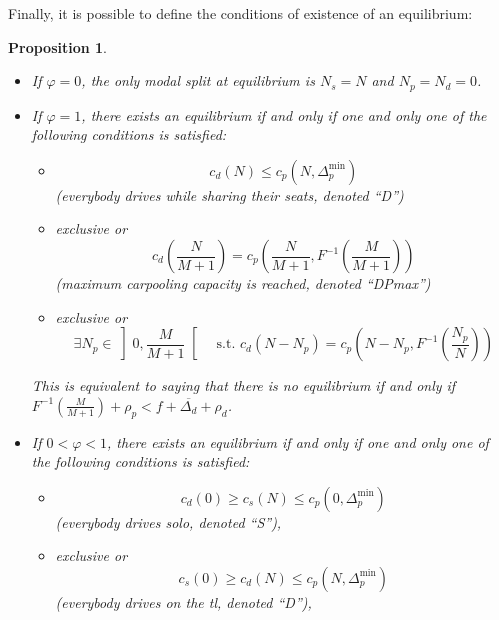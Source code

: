 \documentclass[english, a4paper]{article}
\theoremstyle{plain}
\newtheorem{proposition}{Proposition}
\theoremstyle{definition}
\theoremstyle{remark}
\begin{document}
Finally, it is possible to define the conditions of existence of an equilibrium:

\begin{proposition}
\label{proposition:equilibrium_existence_conditions}
    \begin{itemize}
        \item If $\varphi = 0$, the only modal split at equilibrium is $N_s = N$ and $N_p = N_d = 0$.
        \item If $\varphi = 1$, there exists an equilibrium if and only if one and only one of the following conditions is satisfied:
        \begin{itemize}
            \item \begin{equation} \label{equation:phi0_condD} c_d(N) \leq c_p(N, \Delta_p^{\text{min}}) \end{equation} (everybody drives while sharing their seats, denoted ``D'')
            \item exclusive or \begin{equation} \label{equation:phi0_condDPmax} c_d\left(\frac{N}{M + 1} \right) = c_p\left(\frac{N}{M + 1}, F^{-1}\left(\frac{M}{M + 1}\right)\right) \end{equation} (maximum carpooling capacity is reached, denoted ``DPmax'')
            \item exclusive or \begin{equation} \label{equation:phi0_condDP} \exists N_p \in \left]0, \frac{M}{M+1}\right[ \quad \text{s.t. } c_d(N - N_p ) = c_p\left(N - N_p, F^{-1}\left(\frac{N_p}{N}\right)\right)\end{equation}
        \end{itemize}
        This is equivalent to saying that there is no equilibrium if and only if $F^{-1}\left(\frac{M}{M + 1}\right) + \rho_p < f + \overline{\Delta_d} + \rho_d$.
        \item If $0 < \varphi < 1$, there exists an equilibrium if and only if one and only one of the following conditions is satisfied:
        \begin{itemize}
            \item \begin{equation} \label{equation:phiint_condS} c_d(0) \geq c_s(N) \leq c_p(0, \Delta_p^{\text{min}})\end{equation} (everybody drives solo, denoted ``S''),
            \item exclusive or \begin{equation} \label{equation:phiint_condD} c_s(0) \geq c_d(N) \leq c_p(N, \Delta_p^{\text{min}})\end{equation} (everybody drives on the \acrshort{tl}, denoted ``D''),

\end{itemize}
\end{itemize}
\end{proposition}
\end{document}
